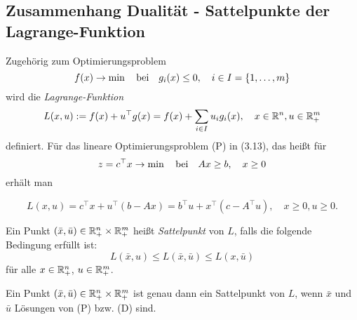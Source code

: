\subsection{Zusammenhang Dualität - Sattelpunkte der Lagrange-Funktion}
Zugehörig zum Optimierungsproblem
\[ f(x) \to \min \quad \text{bei} \quad g_i (x) \le 0, \quad i \in I = \{1, \ldots, m \} \]
wird die \emph{Lagrange-Funktion}
\[ L(x,u) := f(x) + u^\top g(x) = f(x) + \sum_{i \in I} u_i g_i(x), \quad x \in
  \mathbb{R}^n, u \in \mathbb{R}^m_+ \]
definiert. Für das lineare Optimierungsproblem (P) in (3.13), das heißt für
\[ z = c^\top x \to \min \quad \text{bei} \quad Ax \ge b, \quad x \ge 0 \]
erhält man
\addtocounter{equation}{3}
\begin{equation}
  L(x,u) = c^\top x + u^\top (b-Ax) = b^\top u + x^\top (c - A^\top u), \quad
  x \ge 0, u \ge 0.
\end{equation}

\begin{defn}
  Ein Punkt $(\bar{x}, \bar{u}) \in \mathbb{R}^n_+ \times \mathbb{R}^m_+$ heißt
  \emph{Sattelpunkt} von $L$, falls die folgende Bedingung erfüllt ist:
  \[ L( \bar{x}, u ) \le L(\bar{x},\bar{u}) \le L(x, \bar{u} )\]
  für alle $x \in \mathbb{R}^n_+$, $u \in \mathbb{R}^m_+$.
\end{defn}

\begin{thm}[Sattelpunktstheorem]
  Ein Punkt $(\bar{x}, \bar{u}) \in \mathbb{R}^n_+ \times \mathbb{R}^m_+$ ist genau dann
  ein Sattelpunkt von $L$, wenn $\bar{x}$ und $\bar{u}$ Lösungen von (P) bzw.
  (D) sind.
\end{thm}

